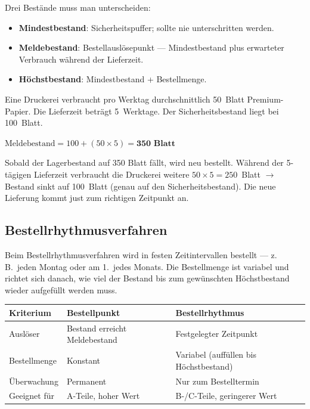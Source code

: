 \documentclass[11pt, a4paper]{article}
\begin{document}
Drei Bestände muss man unterscheiden:

\begin{itemize}[itemsep=0pt]
  \item \textbf{Mindestbestand}: Sicherheitspuffer; sollte nie unterschritten werden.
  \item \textbf{Meldebestand}: Bestellauslösepunkt --- Mindestbestand plus erwarteter Verbrauch während der Lieferzeit.
  \item \textbf{Höchstbestand}: Mindestbestand + Bestellmenge.
\end{itemize}

\begin{beispiel}
Eine Druckerei verbraucht pro Werktag durchschnittlich 50~Blatt Premium-Papier.
Die Lieferzeit beträgt 5~Werktage. Der Sicherheits\-bestand liegt bei 100~Blatt.

\medskip
$\text{Meldebestand} = 100 + (50 \times 5) = \textbf{350 Blatt}$

\medskip
Sobald der Lagerbestand auf 350 Blatt fällt, wird neu bestellt. Während der 5-tägigen
Lieferzeit verbraucht die Druckerei weitere $50 \times 5 = 250$~Blatt $\to$ Bestand
sinkt auf 100~Blatt (genau auf den Sicherheits\-bestand). Die neue Lieferung kommt
just zum richtigen Zeitpunkt an.
\end{beispiel}

\subsection{Bestellrhythmusverfahren}

Beim Bestellrhythmus­verfahren wird in festen Zeit­intervallen bestellt --- z.\,B.\ jeden
Montag oder am 1.\ jedes Monats. Die Bestellmenge ist variabel und richtet sich danach,
wie viel der Bestand bis zum gewünschten Höchst\-bestand wieder aufgefüllt werden muss.

\begin{center}
\begin{tabular}{p{4cm} p{4.5cm} p{4.5cm}}
\toprule
\textbf{Kriterium} & \textbf{Bestellpunkt} & \textbf{Bestellrhythmus}\\
\midrule
Auslöser & Bestand erreicht Meldebestand & Festgelegter Zeitpunkt\\
Bestellmenge & Konstant & Variabel (auffüllen bis Höchstbestand)\\
Überwachung & Permanent & Nur zum Bestelltermin\\
Geeignet für & A-Teile, hoher Wert & B-/C-Teile, geringerer Wert\\
\bottomrule
\end{tabular}
\end{center}
\end{document}
